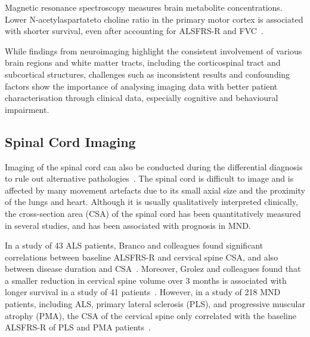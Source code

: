 Magnetic resonance spectroscopy measures brain metabolite concentrations.
Lower N-acetylaspartateto choline ratio in the primary motor cortex is associated with shorter survival, even after accounting for ALSFRS-R and FVC~\cite{kalraCerebralDegenerationPredicts2006}.

While findings from neuroimaging highlight the consistent involvement of various brain regions and white matter tracts, including the corticospinal tract and subcortical structures, challenges such as inconsistent results and confounding factors show the importance of analysing imaging data with better patient characterisation through clinical data, especially cognitive and behavioural impairment.

\subsection{Spinal Cord Imaging}

Imaging of the spinal cord can also be conducted during the differential diagnosis to rule out alternative pathologies~\cite{elmendiliSpinalCordImaging2019}.
The spinal cord is difficult to image and is affected by many movement artefacts due to its small axial size and the proximity of the lungs and heart.
Although it is usually qualitatively interpreted clinically, the cross-section area (CSA) of the spinal cord has been quantitatively measured in several studies, and has been associated with prognosis in MND.

In a study of 43 ALS patients, Branco and colleagues found significant correlations between baseline ALSFRS-R and cervical spine CSA, and also between disease duration and CSA~\cite{brancoSpinalCordAtrophy2014}.
Moreover, Grolez and colleagues found that a smaller reduction in cervical spine volume over 3 months is associated with longer survival in a study of 41 patients~\cite{grolezMRICervicalSpinal2018}.
However, in a study of 218 MND patients, including ALS, primary lateral sclerosis (PLS), and progressive muscular atrophy (PMA), the CSA of the cervical spine only correlated with the baseline ALSFRS-R of PLS and PMA patients~\cite{vanderburghCrosssectionalLongitudinalAssessment2019}.


